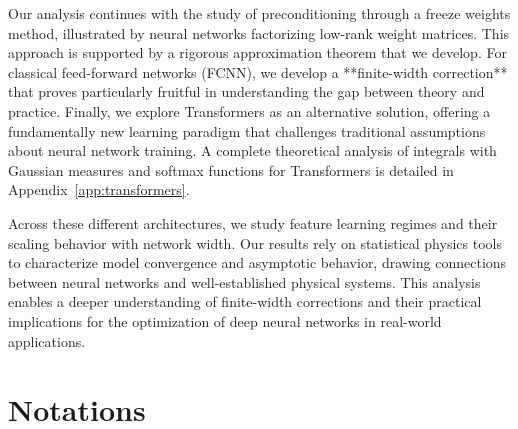 \documentclass[a4paper]{article}
\newcommand{\Kop}{\textcolor{kernelcolor}{\mathbf{K}}}
\newcommand{\Kop}{\textcolor{kernelcolor}{\mathbf{K}}}
\newcommand{\Kop}{\textcolor{kernelcolor}{\mathbf{K}}}
\theoremstyle{plain}
\theoremstyle{definition}
\theoremstyle{remark}
\begin{document}
Our analysis continues with the study of \Kop preconditioning through a freeze weights method, illustrated by neural networks factorizing low-rank weight matrices. This approach is supported by a rigorous approximation theorem that we develop. For classical feed-forward networks (FCNN), we develop a **finite-width correction** that proves particularly fruitful in understanding the gap between theory and practice. Finally, we explore Transformers as an alternative solution, offering a fundamentally new learning paradigm that challenges traditional assumptions about neural network training. A complete theoretical analysis of integrals with Gaussian measures and softmax functions for Transformers is detailed in Appendix~\ref{app:transformers}.

Across these different architectures, we study feature learning regimes and their scaling behavior with network width. Our results rely on statistical physics tools to characterize model convergence and asymptotic behavior, drawing connections between neural networks and well-established physical systems. This analysis enables a deeper understanding of finite-width corrections \cite{seleznova2022ntk_beyond} and their practical implications for the optimization of deep neural networks in real-world applications.


\newpage
{}
\section*{Notations}
\end{document}
